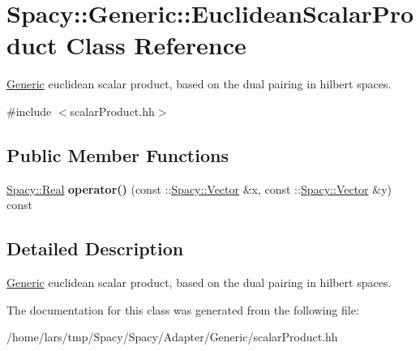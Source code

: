 \hypertarget{classSpacy_1_1Generic_1_1EuclideanScalarProduct}{}\section{Spacy\+:\+:Generic\+:\+:Euclidean\+Scalar\+Product Class Reference}
\label{classSpacy_1_1Generic_1_1EuclideanScalarProduct}


\hyperlink{namespaceSpacy_1_1Generic}{Generic} euclidean scalar product, based on the dual pairing in hilbert spaces.  




{\ttfamily \#include $<$scalar\+Product.\+hh$>$}

\subsection*{Public Member Functions}
\begin{DoxyCompactItemize}
\item 
\hyperlink{classSpacy_1_1Real}{Spacy\+::\+Real} {\bfseries operator()} (const \+::\hyperlink{classSpacy_1_1Vector}{Spacy\+::\+Vector} \&x, const \+::\hyperlink{classSpacy_1_1Vector}{Spacy\+::\+Vector} \&y) const \hypertarget{classSpacy_1_1Generic_1_1EuclideanScalarProduct_a7aa8a7d9b912b0a72386317435897f81}{}\label{classSpacy_1_1Generic_1_1EuclideanScalarProduct_a7aa8a7d9b912b0a72386317435897f81}

\end{DoxyCompactItemize}


\subsection{Detailed Description}
\hyperlink{namespaceSpacy_1_1Generic}{Generic} euclidean scalar product, based on the dual pairing in hilbert spaces. 

The documentation for this class was generated from the following file\+:\begin{DoxyCompactItemize}
\item 
/home/lars/tmp/\+Spacy/\+Spacy/\+Adapter/\+Generic/scalar\+Product.\+hh\end{DoxyCompactItemize}

